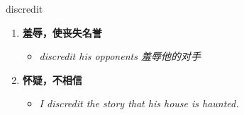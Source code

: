 
\begin{frame}
{\huge discredit}
\begin{center}
\begin{enumerate}\Large
  \item \textbf{羞辱，使丧失名誉}
  \begin{itemize}
    \item \em{\Large{discredit his opponents 羞辱他的对手}}
  \end{itemize}
  \item \textbf{怀疑，不相信}
  \begin{itemize}
    \item \em{\Large{I discredit the story that his house is haunted.}}
  \end{itemize}
\end{enumerate}
\end{center}
\end{frame}
